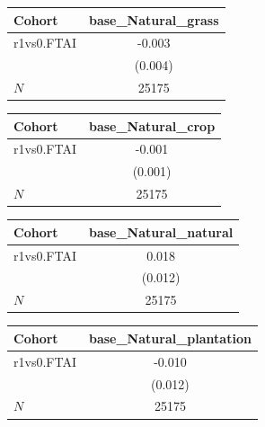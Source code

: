 {
\def\sym#1{\ifmmode^{#1}\else\(^{#1}\)\fi}
\begin{tabular}{l*{1}{c}}
\toprule
Cohort    &base\_Natural\_grass   \\
\midrule
r1vs0.FTAI&   -0.003   \\
          &  (0.004)   \\
\midrule
\(N\)     &    25175   \\
\bottomrule
\end{tabular}
}
{
\def\sym#1{\ifmmode^{#1}\else\(^{#1}\)\fi}
\begin{tabular}{l*{1}{c}}
\toprule
Cohort    &base\_Natural\_crop   \\
\midrule
r1vs0.FTAI&   -0.001   \\
          &  (0.001)   \\
\midrule
\(N\)     &    25175   \\
\bottomrule
\end{tabular}
}
{
\def\sym#1{\ifmmode^{#1}\else\(^{#1}\)\fi}
\begin{tabular}{l*{1}{c}}
\toprule
Cohort    &base\_Natural\_natural   \\
\midrule
r1vs0.FTAI&    0.018   \\
          &  (0.012)   \\
\midrule
\(N\)     &    25175   \\
\bottomrule
\end{tabular}
}
{
\def\sym#1{\ifmmode^{#1}\else\(^{#1}\)\fi}
\begin{tabular}{l*{1}{c}}
\toprule
Cohort    &base\_Natural\_plantation   \\
\midrule
r1vs0.FTAI&   -0.010   \\
          &  (0.012)   \\
\midrule
\(N\)     &    25175   \\
\bottomrule
\end{tabular}
}
